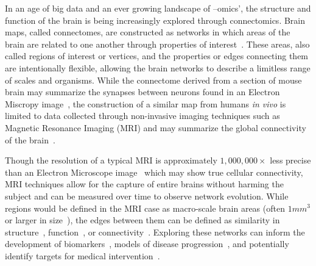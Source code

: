 In an age of big data and an ever growing landscape of –omics', the structure and function of the brain is being
increasingly explored through connectomics. Brain maps, called connectomes, are constructed as networks in which areas
of the brain are related to one another through properties of interest~\cite{fornito2015connectomics}. These areas,
also called regions of interest or vertices, and the properties or edges connecting them are intentionally flexible,
allowing the brain networks to describe a limitless range of scales and organisms. While the connectome derived from a
section of mouse brain may summarize the synapses between neurons found in an Electron Miscropy
image~\cite{zingg2014neural}, the construction of a similar map from humans \textit{in vivo} is limited to data
collected through non-invasive imaging techniques such as Magnetic Resonance Imaging
(MRI) and may summarize the global connectivity of the brain~\cite{sporns2013human,van2012future,hagmann2005diffusion}.

Though the resolution of a typical MRI is approximately $1,000,000 \times$ less precise than an Electron Microscope
image~\cite{kasthuri2015saturated} which may show true cellular connectivity, MRI techniques allow for the capture of
entire brains without harming the subject and can be measured over time to observe network evolution. While regions
would be defined in the MRI case as macro-scale brain areas (often $1mm^3$ or larger in
size~\cite{sotiropoulos2013advances}), the edges between them can be defined as similarity in
structure~\cite{zielinski2010network,alexander2013convergence,montembeault2012impact},
function~\cite{zuo2012network,cao2014topological,kelly2012characterizing}, or
connectivity~\cite{sporns2005human,ingalhalikar2014sex,sporns2013human}. Exploring these networks can inform the
development of biomarkers~\cite{alexander2013convergence,ingalhalikar2014sex}, models of disease
progression~\cite{shah2017altered,yan2018rich}, and potentially identify targets for medical
intervention~\cite{silasi2014stroke,iturria2017multifactorial}.

